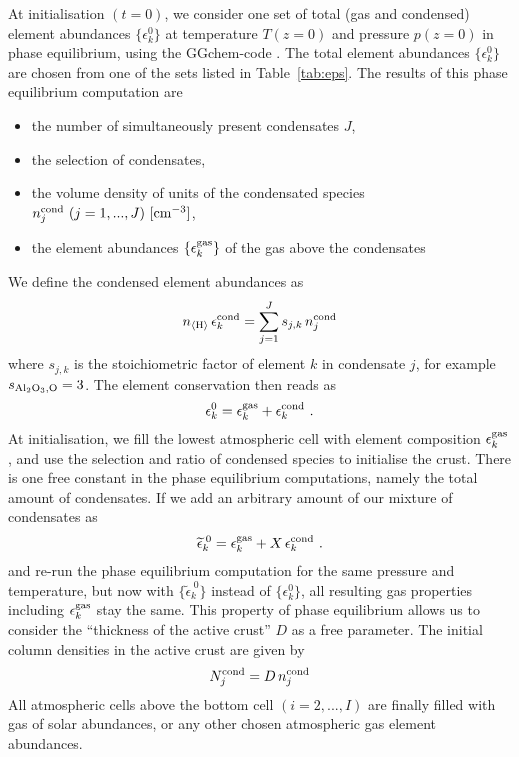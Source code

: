 \documentclass[11pt]{article}
\def\nH{n_{\langle\rm H\rangle}}
\begin{document}
At initialisation $(t=0)$, we consider one set of total (gas and
condensed) element abundances $\{\epsilon_k^0\}$ at temperature
$T(z=0)$ and pressure $p(z=0)$ in phase equilibrium, using the {\sc
  GGchem}-code \citep{Woitke2017}.  The total element abundances
$\{\epsilon_k^0\}$ are chosen from one of the sets listed in
Table~\ref{tab:eps}. The results of this phase equilibrium 
computation are
\begin{itemize}
\itemsep=-1pt
\parsep=0pt
  \item the number of simultaneously present condensates $J$,
  \item the selection of condensates,
  \item the volume density of units of the condensated species 
        $n_j^{\rm cond}\ (j=1,...,J)\ \rm[cm^{-3}]$,
  \item the element abundances $\{\epsilon_k^{\rm gas}\}$ of the gas
        above the condensates
\end{itemize}
We define the condensed element abundances as
\begin{equation}
  \nH\,\epsilon_k^{\rm cond} = \sum_{j=1}^J s_{j,k}\,n_j^{\rm cond}
\end{equation}
where $s_{j,k}$ is the stoichiometric factor of element $k$ in
condensate $j$, for example $s_{\rm Al_2O_3,O}=3$. The element
conservation then reads as
\begin{equation}
  \epsilon_k^0 = \epsilon_k^{\rm gas} + \epsilon_k^{\rm cond} \ .
\end{equation}
At initialisation, we fill the lowest atmospheric cell with element
composition $\epsilon_k^{\rm gas}$, and use the selection and ratio of
condensed species to initialise the crust. There is one free constant
in the phase equilibrium computations, namely the total amount of
condensates. If we add an arbitrary amount of our mixture of
condensates as
\begin{equation}
  \widetilde{\epsilon}_k^{\;0} = \epsilon_k^{\rm gas} 
                           + X\,\epsilon_k^{\rm cond} \ .
\end{equation}
and re-run the phase equilibrium computation for the same pressure
and temperature, but now with $\{\widetilde\epsilon_k^{\;0}\}$ instead of
$\{\epsilon_k^0\}$, all resulting gas properties including $\epsilon_k^{\rm
  gas}$ stay the same.  This property of phase equilibrium allows us
to consider the ``thickness of the active crust'' $D$ as a free 
parameter. The initial column densities in the active crust are
given by
\begin{equation}
  N_j^{\rm cond} = D\,n_j^{\rm cond}
\end{equation}
All atmospheric cells above the bottom cell $(i=2,...,I)$ are finally
filled with gas of solar abundances, or any other chosen atmospheric gas
element abundances.
\end{document}
